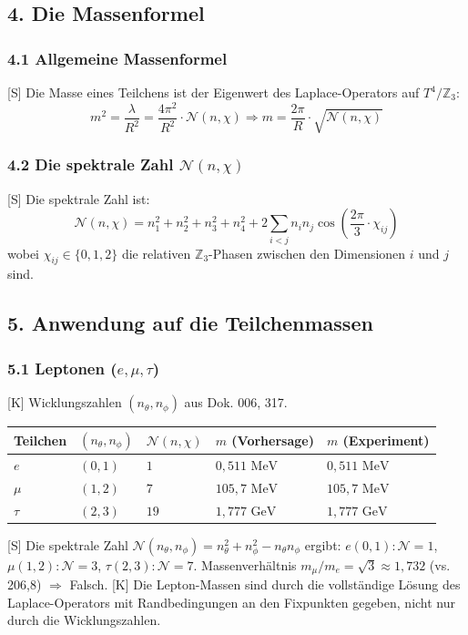\documentclass[11pt,a4paper]{article}
\begin{document}
	\subsection{4. Die Massenformel}
	\subsubsection{4.1 Allgemeine Massenformel}
	[S] Die Masse eines Teilchens ist der Eigenwert des Laplace-Operators auf $T^4/\mathbb{Z}_3$:
	\begin{equation}
		m^2 = \frac{\lambda}{R^2} = \frac{4\pi^2}{R^2} \cdot \mathcal{N}(n, \chi) \Rightarrow m = \frac{2\pi}{R} \cdot \sqrt{\mathcal{N}(n, \chi)}
	\end{equation}
	
	\subsubsection{4.2 Die spektrale Zahl $\mathcal{N}(n, \chi)$}
	[S] Die spektrale Zahl ist:
	\begin{equation}
		\mathcal{N}(n, \chi) = n_1^2 + n_2^2 + n_3^2 + n_4^2 + 2\sum_{i<j} n_i n_j \cos\left(\frac{2\pi}{3} \cdot \chi_{ij}\right)
	\end{equation}
	wobei $\chi_{ij} \in \{0,1,2\}$ die relativen $\mathbb{Z}_3$-Phasen zwischen den Dimensionen $i$ und $j$ sind.
	
	\subsection{5. Anwendung auf die Teilchenmassen}
	\subsubsection{5.1 Leptonen ($e, \mu, \tau$)}
	[K] Wicklungszahlen $(n_\theta, n_\phi)$ aus Dok. 006, 317.
	\begin{longtable}{lllll}
		\toprule
		\textbf{Teilchen} & $(n_\theta, n_\phi)$ & $\mathcal{N}(n, \chi)$ & $m$ (Vorhersage) & $m$ (Experiment) \\
		\midrule
		\endhead
		\bottomrule
		\endfoot
		$e$ & $(0, 1)$ & $1$ & $0{,}511\text{ MeV}$ & $0{,}511\text{ MeV}$ \\
		$\mu$ & $(1, 2)$ & $7$ & $105{,}7\text{ MeV}$ & $105{,}7\text{ MeV}$ \\
		$\tau$ & $(2, 3)$ & $19$ & $1{,}777\text{ GeV}$ & $1{,}777\text{ GeV}$ \\
	\end{longtable}
	[S] Die spektrale Zahl $\mathcal{N}(n_\theta, n_\phi) = n_\theta^2 + n_\phi^2 - n_\theta n_\phi$ ergibt:
	$e(0,1): \mathcal{N} = 1$, $\mu(1,2): \mathcal{N} = 3$, $\tau(2,3): \mathcal{N} = 7$.
	Massenverhältnis $m_\mu/m_e = \sqrt{3} \approx 1{,}732$ (vs. 206,8) $\Rightarrow$ Falsch.
	[K] Die Lepton-Massen sind durch die vollständige Lösung des Laplace-Operators mit Randbedingungen an den Fixpunkten gegeben, nicht nur durch die Wicklungszahlen.
	
\end{document}

